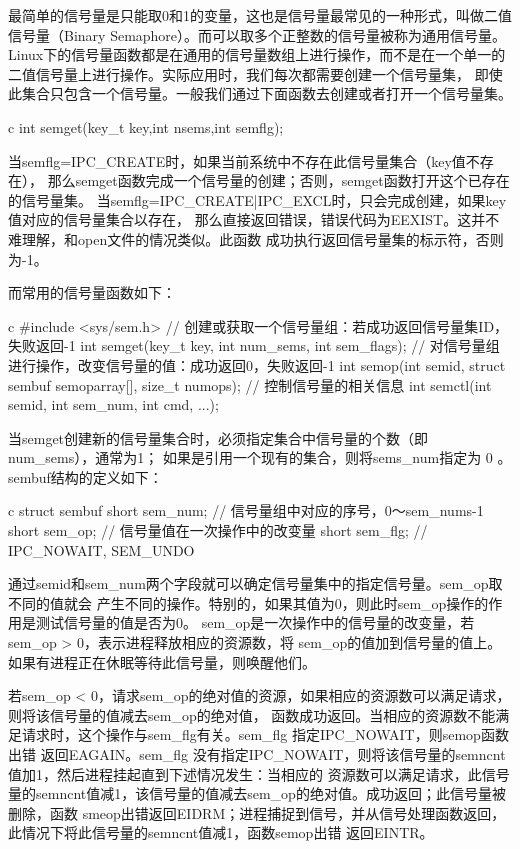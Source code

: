 最简单的信号量是只能取0和1的变量，这也是信号量最常见的一种形式，叫做二值信号量（Binary Semaphore）。而可以取多个正整数的信号量被称为通用信号量。
Linux下的信号量函数都是在通用的信号量数组上进行操作，而不是在一个单一的二值信号量上进行操作。实际应用时，我们每次都需要创建一个信号量集，
即使此集合只包含一个信号量。一般我们通过下面函数去创建或者打开一个信号量集。
\begin{code-block}{c}
int semget(key_t key,int nsems,int semflg);
\end{code-block}

当semflg=IPC\_CREATE时，如果当前系统中不存在此信号量集合（key值不存在），
那么semget函数完成一个信号量的创建；否则，semget函数打开这个已存在的信号量集。
当semflg=IPC\_CREATE|IPC\_EXCL时，只会完成创建，如果key值对应的信号量集合以存在，
那么直接返回错误，错误代码为EEXIST。这并不难理解，和open文件的情况类似。此函数
成功执行返回信号量集的标示符，否则为-1。

而常用的信号量函数如下：
\begin{code-block}{c}
#include <sys/sem.h>
// 创建或获取一个信号量组：若成功返回信号量集ID，失败返回-1
int semget(key_t key, int num_sems, int sem_flags);
// 对信号量组进行操作，改变信号量的值：成功返回0，失败返回-1
int semop(int semid, struct sembuf semoparray[], size_t numops);
// 控制信号量的相关信息
int semctl(int semid, int sem_num, int cmd, ...);
\end{code-block}

当semget创建新的信号量集合时，必须指定集合中信号量的个数（即num\_sems），通常为1；
如果是引用一个现有的集合，则将sems\_num指定为 0 。sembuf结构的定义如下：
\begin{code-block}{c}
struct sembuf
{
    short sem_num; // 信号量组中对应的序号，0～sem_nums-1
    short sem_op;  // 信号量值在一次操作中的改变量
    short sem_flg; // IPC_NOWAIT, SEM_UNDO
}
\end{code-block}

通过semid和sem\_num两个字段就可以确定信号量集中的指定信号量。sem\_op取不同的值就会
产生不同的操作。特别的，如果其值为0，则此时sem\_op操作的作用是测试信号量的值是否为0。
sem\_op是一次操作中的信号量的改变量，若sem\_op > 0，表示进程释放相应的资源数，将
sem\_op的值加到信号量的值上。如果有进程正在休眠等待此信号量，则唤醒他们。

若sem\_op < 0，请求sem\_op的绝对值的资源，如果相应的资源数可以满足请求，则将该信号量的值减去sem\_op的绝对值，
函数成功返回。当相应的资源数不能满足请求时，这个操作与sem\_flg有关。sem\_flg 指定IPC\_NOWAIT，则semop函数出错
返回EAGAIN。sem\_flg 没有指定IPC\_NOWAIT，则将该信号量的semncnt值加1，然后进程挂起直到下述情况发生：当相应的
资源数可以满足请求，此信号量的semncnt值减1，该信号量的值减去sem\_op的绝对值。成功返回；此信号量被删除，函数
smeop出错返回EIDRM；进程捕捉到信号，并从信号处理函数返回，此情况下将此信号量的semncnt值减1，函数semop出错
返回EINTR。

